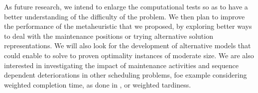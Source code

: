 \documentclass[a4paper,11pt]{article}
\begin{document}
As future research, we intend to enlarge the computational tests so as to have a better understanding of the difficulty of the problem. We then plan to improve the performance of the metaheuristic that we proposed, by exploring better ways to deal with the maintenance positions or trying alternative solution representations. We will also look for the development of alternative models that could enable to solve to proven optimality instances of moderate size. We are also interested in investigating the impact of maintenance activities and sequence dependent deteriorations in other scheduling problems, foe example considering weighted completion time, as done in \cite{kramer2019enhanced}, or weighted tardiness.

~\\


\end{document}
